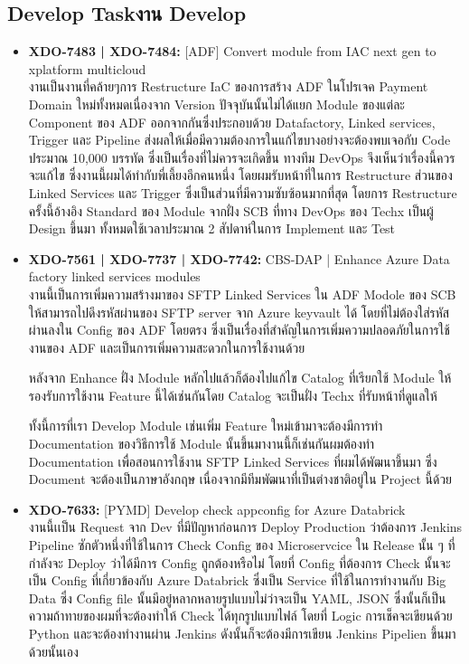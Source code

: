 \subsection{\ifenglish Develop Task\else งาน Develop\fi}
\begin{itemize}
      \item \textbf{XDO-7483 | XDO-7484:} [ADF] Convert module from IAC next gen to xplatform multicloud\\
            งานเป็นงานที่คล้ายๆการ Restructure IaC ของการสร้าง ADF ในโปรเจค Payment Domain ใหม่ทั้งหมดเนื่องจาก Version ปัจจุบันนั้นไม่ได้แยก Module ของแต่ละ Component ของ ADF ออกจากกันซึ่งประกอบด้วย Datafactory, Linked services, Trigger และ Pipeline ส่งผลให้เมื่อมีความต้องการในแก้ไขบางอย่างจะต้องพบเจอกับ Code ประมาณ 10,000 บรรทัด ซึ่งเป็นเรื่องที่ไม่ควรจะเกิดขึ้น ทางทีม DevOps จึงเห็นว่าเรื่องนี้ควรจะแก้ไข ซึ่งงานนี้ผมได้ทำกับพี่เลี้ยงอีกคนหนึ่ง โดยผมรับหน้าที่ในการ Restructure ส่วนของ Linked Services และ Trigger ซึ่งเป็นส่วนที่มีความซับซ้อนมากที่สุด โดยการ Restructure ครั้งนี้อ้างอิง Standard ของ Module จากฝั่ง SCB ที่ทาง DevOps ของ Techx เป็นผู้ Design ขึ้นมา ทั้งหมดใช้เวลาประมาณ 2 สัปดาห์ในการ Implement และ Test
      \item \textbf{XDO-7561 | XDO-7737 | XDO-7742:} CBS-DAP | Enhance Azure Data factory linked services modules\\
            งานนี้เป็นการเพิ่มความสร้างมาของ SFTP Linked Services ใน ADF Modole ของ SCB ให้สามารถไปดึงรหัสผ่านของ SFTP server จาก Azure keyvault ได้ โดยที่ไม่ต้องใส่รหัสผ่านลงใน Config ของ ADF โดยตรง ซึ่งเป็นเรื่องที่สำคัญในการเพิ่มความปลอดภัยในการใช้งานของ ADF และเป็นการเพิ่มความสะดวกในการใช้งานด้วย

            หลังจาก Enhance ฝั่ง Module หลักไปแล้วก็ต้องไปแก้ไข Catalog ที่เรียกใช้ Module ให้รองรับการใช้งาน Feature นี้ได้เช่นกันโดย Catalog จะเป็นฝั่ง Techx ที่รับหน้าที่ดูแลให้

            ทั้งนี้การที่เรา Develop Module เช่นเพิ่ม Feature ใหม่เข้ามาจะต้องมีการทำ Documentation ของวิธีการใช้ Module นั้นขึ้นมางานนี้ก็เช่นกันผมต้องทำ Documentation เพื่อสอนการใช้งาน SFTP Linked Services ที่ผมได้พัฒนาขึ้นมา ซึ่ง Document จะต้องเป็นภาษาอังกฤษ เนื่องจากมีทีมพัฒนาที่เป็นต่างชาติอยู่ใน Project นี้ด้วย
      \item \textbf{XDO-7633:} [PYMD] Develop check appconfig for Azure Databrick\\
            งานนี้เเป็น Request จาก Dev ที่มีปัญหาก่อนการ Deploy Production ว่าต้องการ Jenkins Pipeline ซักตัวหนึ่งที่ใช้ในการ Check Config ของ Microservcice ใน Release นั้น ๆ ที่กำลังจะ Deploy ว่าได้มีการ Config ถูกต้องหรือไม่ โดยที่ Config ที่ต้องการ Check นั้นจะเป็น Config ที่เกี่ยวข้องกับ Azure Databrick ซึ่งเป็น Service ที่ใช้ในการทำงานกับ Big Data ซึ่ง Config file นั้นมีอยู๋หลากหลายรูปแบบไม่ว่าจะเป็น YAML, JSON ซึ่งนั้นก็เป็นความถ้าทายของผมที่จะต้องทำให้ Check ได้ทุกรูปแบบไฟล์ โดยที่ Logic การเช็คจะเขียนด้วย Python และจะต้องทำงานผ่าน Jenkins ดังนั้นก็จะต้องมีการเขียน Jenkins Pipelien ขึ้นมาด้วยนั้นเอง
\end{itemize}

